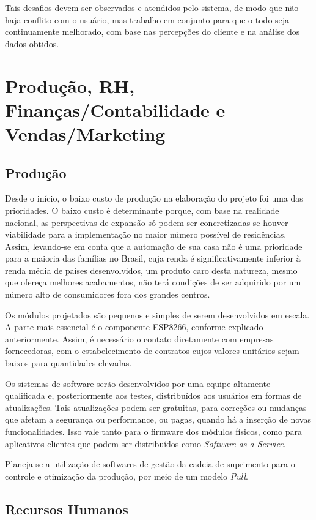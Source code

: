 Tais desafios devem ser observados e atendidos pelo sistema, de modo que não haja conflito com o usuário, mas trabalho em conjunto para que o todo seja continuamente melhorado, com base nas percepções do cliente e na análise dos dados obtidos.

\section{Produção, RH, Finanças/Contabilidade e Vendas/Marketing}

\subsection{Produção}

Desde o início, o baixo custo de produção na elaboração do projeto foi uma das prioridades. O baixo custo é determinante porque, com base na realidade nacional, as perspectivas de expansão só podem ser concretizadas se houver viabilidade para a implementação no maior número possível de residências. Assim, levando-se em conta que a automação de sua casa não é uma prioridade para a maioria das famílias no Brasil, cuja renda é significativamente inferior à renda média de países desenvolvidos, um produto caro desta natureza, mesmo que ofereça melhores acabamentos, não terá condições de ser adquirido por um número alto de consumidores fora dos grandes centros.

Os módulos projetados são pequenos e simples de serem desenvolvidos em escala. A parte mais essencial é o componente ESP8266, conforme explicado anteriormente. Assim, é necessário o contato diretamente com empresas fornecedoras, com o estabelecimento de contratos cujos valores unitários sejam baixos para quantidades elevadas.

Os sistemas de software serão desenvolvidos por uma equipe altamente qualificada e, posteriormente aos testes, distribuídos aos usuários em formas de atualizações. Tais atualizações podem ser gratuitas, para correções ou mudanças que afetam a segurança ou performance, ou pagas, quando há a inserção de novas funcionalidades. Isso vale tanto para o firmware dos módulos físicos, como para aplicativos clientes que podem ser distribuídos como \emph{Software as a Service}.

Planeja-se a utilização de softwares de gestão da cadeia de suprimento para o controle e otimização da produção, por meio de um modelo \emph{Pull}.

\subsection{Recursos Humanos}


